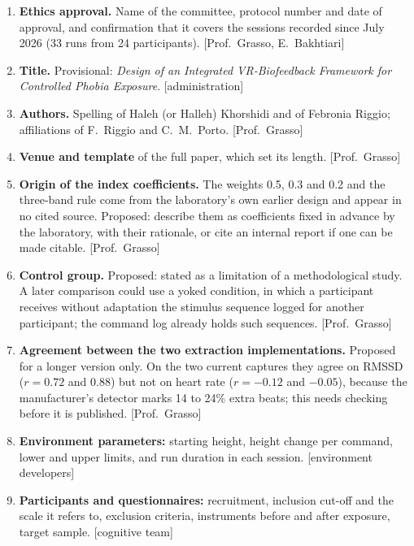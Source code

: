 \documentclass[11pt,a4paper]{article}
\newcommand{\ph}[1]{\textcolor{red!65!black}{[#1]}}
\begin{document}
\begin{enumerate}
    \item \textbf{Ethics approval.} Name of the committee, protocol
    number and date of approval, and confirmation that it covers the
    sessions recorded since July 2026 (33 runs from 24 participants).
    \ph{Prof.~Grasso, E.~Bakhtiari}

    \item \textbf{Title.} Provisional: \emph{Design of an Integrated
    VR-Biofeedback Framework for Controlled Phobia Exposure}.
    \ph{administration}

    \item \textbf{Authors.} Spelling of Haleh (or Halleh) Khorshidi and
    of Febronia Riggio; affiliations of F.~Riggio and C.~M.~Porto.
    \ph{Prof.~Grasso}

    \item \textbf{Venue and template} of the full paper, which set its
    length. \ph{Prof.~Grasso}

    \item \textbf{Origin of the index coefficients.} The weights 0.5,
    0.3 and 0.2 and the three-band rule come from the laboratory's own
    earlier design and appear in no cited source. Proposed: describe
    them as coefficients fixed in advance by the laboratory, with their
    rationale, or cite an internal report if one can be made citable.
    \ph{Prof.~Grasso}

    \item \textbf{Control group.} Proposed: stated as a limitation of a
    methodological study. A later comparison could use a yoked
    condition, in which a participant receives without adaptation the
    stimulus sequence logged for another participant; the command log
    already holds such sequences. \ph{Prof.~Grasso}

    \item \textbf{Agreement between the two extraction
    implementations.} Proposed for a longer version only. On the two
    current captures they agree on RMSSD ($r = 0.72$ and $0.88$) but
    not on heart rate ($r = -0.12$ and $-0.05$), because the
    manufacturer's detector marks 14 to 24\% extra beats; this needs
    checking before it is published. \ph{Prof.~Grasso}

    \item \textbf{Environment parameters:} starting height, height
    change per command, lower and upper limits, and run duration in
    each session. \ph{environment developers}

    \item \textbf{Participants and questionnaires:} recruitment,
    inclusion cut-off and the scale it refers to, exclusion criteria,
    instruments before and after exposure, target sample.
    \ph{cognitive team}
\end{enumerate}
\end{document}
